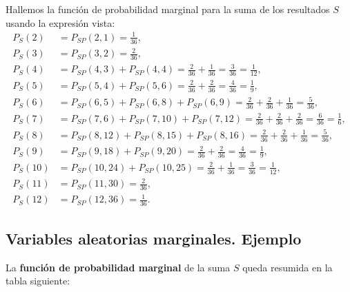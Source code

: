 \documentclass[]{book}
\begin{document}
Hallemos la función de probabilidad marginal para la suma de los resultados \(S\) usando la expresión vista:
\[
\begin{array}{rl}
P_S(2) & = P_{SP}(2,1)=\frac{1}{36},\\
P_S(3) & = P_{SP}(3,2)=\frac{2}{36},\\
P_S(4) & = P_{SP}(4,3)+P_{SP}(4,4)=\frac{2}{36}+\frac{1}{36}=\frac{3}{36}=\frac{1}{12},\\
P_S(5) & = P_{SP}(5,4)+P_{SP}(5,6)=\frac{2}{36}+\frac{2}{36}=\frac{4}{36}=\frac{1}{9},\\
P_S(6) & = P_{SP}(6,5)+P_{SP}(6,8)+P_{SP}(6,9)=\frac{2}{36}+\frac{2}{36}+\frac{1}{36}=\frac{5}{36},\\
P_S(7) & = P_{SP}(7,6)+P_{SP}(7,10)+P_{SP}(7,12)=\frac{2}{36}+\frac{2}{36}+\frac{2}{36}=\frac{6}{36}=\frac{1}{6},\\
P_S(8) & = P_{SP}(8,12)+P_{SP}(8,15)+P_{SP}(8,16)=\frac{2}{36}+\frac{2}{36}+\frac{1}{36}=\frac{5}{36},\\
P_S(9) & = P_{SP}(9,18)+P_{SP}(9,20)=\frac{2}{36}+\frac{2}{36}=\frac{4}{36}=\frac{1}{9},\\
P_S(10) & = P_{SP}(10,24)+P_{SP}(10,25)=\frac{2}{36}+\frac{1}{36}=\frac{3}{36}=\frac{1}{12},\\
P_S(11) & = P_{SP}(11,30)=\frac{2}{36},\\
P_S(12) & = P_{SP}(12,36)=\frac{1}{36}.
\end{array}
\]

\hypertarget{variables-aleatorias-marginales.-ejemplo-1}{%
\subsection{Variables aleatorias marginales. Ejemplo}\label{variables-aleatorias-marginales.-ejemplo-1}}

La \textbf{función de probabilidad marginal} de la suma \(S\) queda resumida en la tabla siguiente:
\end{document}
